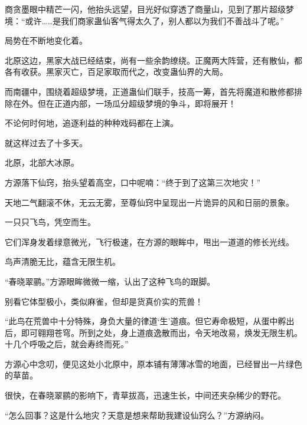 \begin{this_body}
商贪墨眼中精芒一闪，他抬头远望，目光好似穿透了商量山，见到了那片超级梦境：“或许……是我们商家蛊仙客气得太久了，别人都以为我们不善战斗了呢。”

局势在不断地变化着。

北原这边，黑家大战已经结束，尚有一些余韵缭绕。正魔两大阵营，还有散仙，都各有收获。黑家灭亡，百足家取而代之，改变蛊仙界的大局。

而南疆中，围绕着超级梦境，正道蛊仙们联手，技高一筹，首先将魔道和散修都排除在外。但在正道内部，一场瓜分超级梦境的争斗，即将展开！

不论何时何地，追逐利益的种种戏码都在上演。

就这样过去了十多天。

北原，北部大冰原。

方源落下仙窍，抬头望着高空，口中呢喃：“终于到了这第三次地灾！”

天地二气翻滚不休，无云无雾，至尊仙窍中呈现出一片诡异的风和日丽的景象。

一只只飞鸟，凭空而生。

它们浑身发着绿意微光，飞行极速，在方源的眼眸中，甩出一道道的修长光线。

鸟声清脆无比，蕴含无限生机。

“春晓翠鹂。”方源眼眸微微一缩，认出了这种飞鸟的跟脚。

别看它体型极小，类似麻雀，但却是货真价实的荒兽！

“此鸟在荒兽中十分特殊，身负大量的律道‘生’道痕。但它寿命极短，从蛋中孵出后，即可翱翔苍穹。所到之处，身上道痕逸散而出，令天地改易，焕发无限生机。十几个呼吸之后，就会寿终而死。”

方源心中念叨，便见这处小北原中，原本铺有薄薄冰雪的地面，已经冒出一片绿色的草苗。

很快，在春晓翠鹂的影响下，青草拔高，迅速生长，中间还夹杂稀少的野花。

“怎么回事？这是什么地灾？天意是想来帮助我建设仙窍么？”方源纳闷。

\end{this_body}

